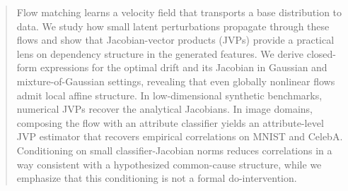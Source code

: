
\begin{abstract}
Flow matching learns a velocity field that transports a base distribution to data. We study how small latent perturbations propagate through these flows and show that Jacobian-vector products (JVPs) provide a practical lens on dependency structure in the generated features. We derive closed-form expressions for the optimal drift and its Jacobian in Gaussian and mixture-of-Gaussian settings, revealing that even globally nonlinear flows admit local affine structure. In low-dimensional synthetic benchmarks, numerical JVPs recover the analytical Jacobians. In image domains, composing the flow with an attribute classifier yields an attribute-level JVP estimator that recovers empirical correlations on MNIST and CelebA. Conditioning on small classifier-Jacobian norms reduces correlations in a way consistent with a hypothesized common-cause structure, while we emphasize that this conditioning is not a formal $\mathrm{do}$-intervention. 
\end{abstract}

